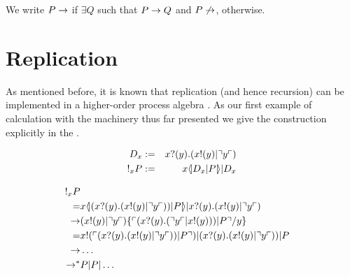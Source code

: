 
We write $P\rightarrow$ if $\exists Q $ such that $ P \rightarrow Q$ and $P\not\rightarrow$, otherwise.

\section{Replication}

As mentioned before, it is known that replication (and hence
recursion) can be implemented in a higher-order process algebra
\cite{SangiorgiWalker}. As our first example of calculation with the
machinery thus far presented we give the construction explicitly in
the {\rhoc}.

\begin{eqnarray}
	D_{x} & := & x?(y) . (x!(y) | \urcorner y \ulcorner) \nonumber\\
	! _{x}{P} & := & x \langle\!| D_{x} | P |\!\rangle | D_{x} \nonumber
\end{eqnarray}

\begin{eqnarray}
	! _{x}{P} & & \nonumber\\
	=
	& x \langle\!| (x?(y) . (x!(y) | \urcorner y \ulcorner)) | P |\!\rangle 
	      | x?(y) . (x!(y) | \urcorner y \ulcorner) & \nonumber\\
	\rightarrow
	& (x!(y) | \urcorner y \ulcorner)\{ \ulcorner (x?(y) . (\urcorner y \ulcorner | x!(y))) | P \urcorner / y \} & \nonumber\\
	=
	& x!(\ulcorner (x?(y) . (x!(y) | \urcorner y \ulcorner)) | P \urcorner)
	  | {(x?(y) . (x!(y) | \urcorner y \ulcorner)) | P} & \nonumber\\
	\rightarrow
	& \ldots & \nonumber\\
	\rightarrow^*
	& P | P | \ldots & \nonumber
\end{eqnarray}

